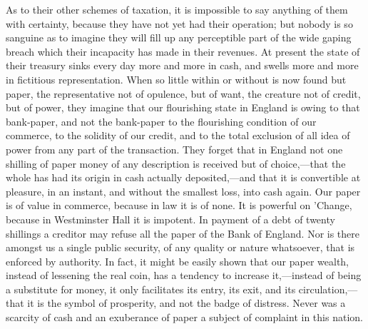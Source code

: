 As to their other schemes of taxation, it is impossible to say anything of them with certainty, because they have not yet had their operation; but nobody is so sanguine as to imagine they will fill up any perceptible part of the wide gaping breach which their incapacity has made in their revenues. At present the state of their treasury sinks every day more and more in cash, and swells more and more in fictitious representation. When so little within or without is now found but paper, the representative not of opulence, but of want, the creature not of credit, but of power, they imagine that our flourishing state in England is owing to that bank-paper, and not the bank-paper to the flourishing condition of our commerce, to the solidity of our credit, and to the total exclusion of all idea of power from any part of the transaction. They forget that in England not one shilling of paper money of any description is received but of choice,—that the whole has had its origin in cash actually deposited,—and that it is convertible at pleasure, in an instant, and without the smallest loss, into cash again. Our paper is of value in commerce, because in law it is of none. It is powerful on 'Change, because in Westminster Hall it is impotent. In payment of a debt of twenty shillings a creditor may refuse all the paper of the Bank of England. Nor is there amongst us a single public security, of any quality or nature whatsoever, that is enforced by authority. In fact, it might be easily shown that our paper wealth, instead of lessening the real coin, has a tendency to increase it,—instead of being a substitute for money, it only facilitates its entry, its exit, and its circulation,—that it is the symbol of prosperity, and not the badge of distress. Never was a scarcity of cash and an exuberance of paper a subject of complaint in this nation.

